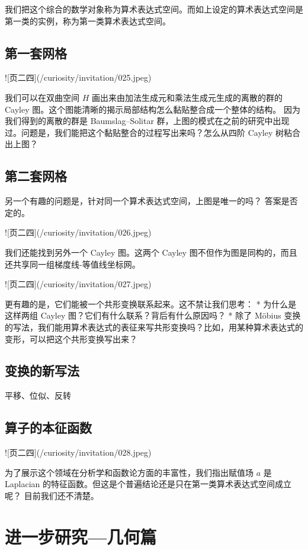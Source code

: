 \documentclass[a4paper,12pt]{book}
\numberwithin{problem}{section}
\numberwithin{definition}{section}
\numberwithin{lemma}{section}
\numberwithin{proposition}{section}
\numberwithin{theorem}{section}
\numberwithin{grammar}{section}
\numberwithin{program}{section}
\numberwithin{convention}{section}
\numberwithin{corollary}{section}
\begin{document}
我们把这个综合的数学对象称为算术表达式空间。而如上设定的算术表达式空间是第一类的实例，称为第一类算术表达式空间。

\section{第一套网格}

![页二四](/curiosity/invitation/025.jpeg)

我们可以在双曲空间 $H$ 画出来由加法生成元和乘法生成元生成的离散的群的 Cayley 图。这个图能清晰的揭示局部结构怎么黏贴整合成一个整体的结构。
因为我们得到的离散的群是 Baumslag–Solitar 群，上图的模式在之前的研究中出现过。问题是，我们能把这个黏贴整合的过程写出来吗？怎么从四阶 Cayley 树粘合出上图？

\section{第二套网格}

另一个有趣的问题是，针对同一个算术表达式空间，上图是唯一的吗？ 答案是否定的。

![页二四](/curiosity/invitation/026.jpeg)

我们还能找到另外一个 Cayley 图。这两个 Cayley 图不但作为图是同构的，而且还共享同一组梯度线-等值线坐标网。

![页二四](/curiosity/invitation/027.jpeg)

更有趣的是，它们能被一个共形变换联系起来。这不禁让我们思考：
* 为什么是这样两组 Cayley 图？它们有什么联系？背后有什么原因吗？
* 除了 Möbius 变换的写法，我们能用算术表达式的表征来写共形变换吗？比如，用某种算术表达式的变形，可以把这个共形变换写出来？

\section{变换的新写法}

平移、位似、反转

\section{算子的本征函数}

![页二四](/curiosity/invitation/028.jpeg)

为了展示这个领域在分析学和函数论方面的丰富性，我们指出赋值场 $a$ 是 Laplacian 的特征函数。但这是个普遍结论还是只在第一类算术表达式空间成立呢？
目前我们还不清楚。

\newpage

\chapter{进一步研究—几何篇}
\end{document}

